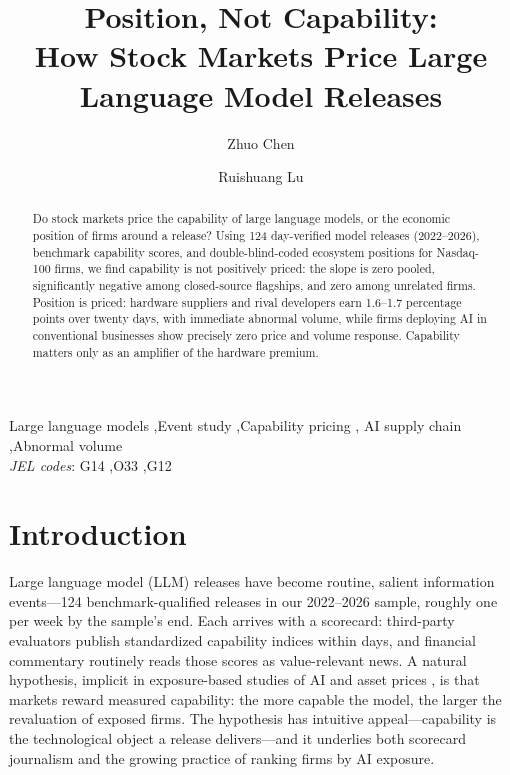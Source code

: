 \documentclass[review,12pt,authoryear]{elsarticle}
\begin{document}
\begin{frontmatter}

\title{Position, Not Capability:\\How Stock Markets Price Large Language Model Releases}

\author[sdu]{Zhuo Chen}
\author[sdu]{Ruishuang Lu}

\begin{abstract}
Do stock markets price the capability of large language models, or the
economic position of firms around a release? Using 124 day-verified model
releases (2022--2026), benchmark capability scores, and double-blind-coded
ecosystem positions for Nasdaq-100 firms, we find capability is not
positively priced: the slope is zero pooled, significantly negative among
closed-source flagships, and zero among unrelated firms. Position is priced:
hardware suppliers and rival developers earn 1.6--1.7 percentage points over
twenty days, with immediate abnormal volume, while firms deploying AI in
conventional businesses show precisely zero price and volume response.
Capability matters only as an amplifier of the hardware premium.
\end{abstract}

\begin{keyword}
Large language models \sep Event study \sep Capability pricing \sep
AI supply chain \sep Abnormal volume
\\ \textit{JEL codes}: G14 \sep O33 \sep G12
\end{keyword}

\end{frontmatter}

\section{Introduction}

Large language model (LLM) releases have become routine, salient information
events---124 benchmark-qualified releases in our 2022--2026 sample, roughly
one per week by the sample's end. Each arrives with a scorecard: third-party
evaluators publish standardized capability indices within days, and
financial commentary routinely reads those scores as value-relevant news. A
natural hypothesis, implicit in exposure-based studies of AI and asset
prices \citep{eisfeldt2023,babina2024}, is that markets reward measured
capability: the more capable the model, the larger the revaluation of
exposed firms. The hypothesis has intuitive appeal---capability is the
technological object a release delivers---and it underlies both scorecard
journalism and the growing practice of ranking firms by AI exposure.
\end{document}
